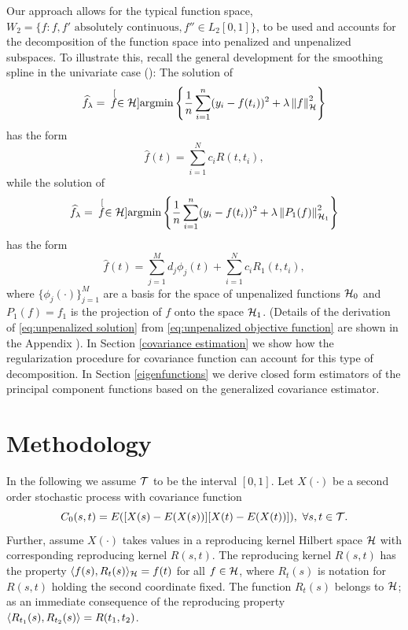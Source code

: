 Our approach allows for the typical function space, $W_2 =  \{f : f, f' \mbox{ absolutely continuous}, f'' \in L_2[0,1]\}$, to be used and accounts for the decomposition of the function space into penalized and unpenalized subspaces. To illustrate this, recall the general development for the smoothing spline in the univariate case (\cite{Wahba:1990}):  The solution of 
\begin{equation}
\widehat{f}_{\lambda} = \hspace{.07in}\stackrel[f \in \mathcal{H}]{}{\mbox{argmin}} \left\{ \frac{1}{n}\sum_{i=1}^{n}(y_i - f(t_i))^2 + \lambda\left\|f\right\|^2_{\mathcal{H}} \right\}
\end{equation}
has the form
\begin{equation}
	\hat{f}(t) = \sum_{i=1}^N c_iR(t, t_i), 
\end{equation}
while the solution of
\begin{equation}
\widehat{f}_{\lambda} = \hspace{.07in}\stackrel[f \in \mathcal{H}]{}{\mbox{argmin}} \left\{ \frac{1}{n}\sum_{i=1}^{n}(y_i - f(t_i))^2 + \lambda\left\|P_1(f)\right\|^2_{\mathcal{H}_1} \right\}
\label{eq:unpenalized objective function}
\end{equation}
has the form
\begin{equation}
	\hat{f}(t) = \sum_{j=1}^M d_j\phi_j(t) + \sum_{i=1}^N c_iR_1(t, t_i), 
	\label{eq:unpenalized solution}
\end{equation}
where $\{\phi_j(\cdot)\}_{j=1}^M$ are a basis for the space of unpenalized functions $\mathcal{H}_0$ and $P_1(f)=f_1$ is the projection of $f$ onto the space $\mathcal{H}_1$. (Details of the derivation of \eqref{eq:unpenalized solution} from \eqref{eq:unpenalized objective function} are shown in the Appendix ). 
In Section \ref{covariance estimation} we show how the regularization procedure for covariance function can account for this type of decomposition.  In Section \ref{eigenfunctions} we derive closed form estimators of the principal component functions based on the generalized covariance estimator. 

\section{Methodology}

 In the following we assume $\mathcal{T}$ to be the interval $[0,1]$. Let $X(\cdot)$ be a second order stochastic process with covariance function
 \[
C_{0}(s,t)=E([X(s)-E(X(s))][X(t)-E(X(t))]),\mbox{  }\forall s,t\in \mathcal{T}.
\]
Further, assume $X(\cdot)$ takes values in a reproducing kernel Hilbert space $\mathcal{H}$ with corresponding reproducing kernel $R(s,t)$. The reproducing kernel $R(s,t)$ has the property $\langle f(s), R_t(s) \rangle_{\mathcal{H}} = f(t)$ for all $f \in \mathcal{H}$, where $R_t(s)$ is notation for $R(s,t)$ holding the second coordinate fixed. The function $R_t(s)$  belongs to $\mathcal{H}$; as an immediate consequence of the reproducing property $\langle R_{t_1}(s), R_{t_2}(s) \rangle = R(t_1, t_2)$. %

